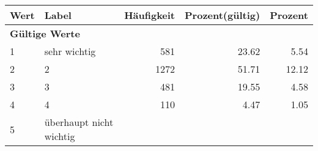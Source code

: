      \begin{longtable}{lXrrr}
     \toprule
     \textbf{Wert} & \textbf{Label} & \textbf{Häufigkeit} & \textbf{Prozent(gültig)} & \textbf{Prozent} \\
     \endhead
     \midrule
     \multicolumn{5}{l}{\textbf{Gültige Werte}}\\

     1 &
     \multicolumn{1}{X}{ sehr wichtig   } &


       \num{581} &
       \num[round-mode=places,round-precision=2]{23.62} &
         \num[round-mode=places,round-precision=2]{5.54} \\

     2 &
     \multicolumn{1}{X}{ 2   } &


       \num{1272} &
       \num[round-mode=places,round-precision=2]{51.71} &
         \num[round-mode=places,round-precision=2]{12.12} \\

     3 &
     \multicolumn{1}{X}{ 3   } &


       \num{481} &
       \num[round-mode=places,round-precision=2]{19.55} &
         \num[round-mode=places,round-precision=2]{4.58} \\

     4 &
     \multicolumn{1}{X}{ 4   } &


       \num{110} &
       \num[round-mode=places,round-precision=2]{4.47} &
         \num[round-mode=places,round-precision=2]{1.05} \\

     5 &
     \multicolumn{1}{X}{ überhaupt nicht wichtig   } &



\end{longtable}
